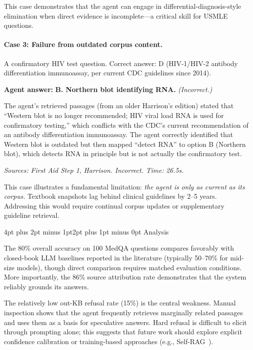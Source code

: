 \documentclass[10pt,twocolumn,letterpaper]{article}
\makeatletter
\renewcommand\subsection{\@startsection{subsection}{2}{\z@}%
  {4pt plus 2pt minus 1pt}{2pt plus 1pt minus 0pt}%
  {\normalsize\bfseries}}
\makeatother
\begin{document}
This case demonstrates that the agent can engage in differential-diagnosis-style elimination when direct evidence is incomplete---a critical skill for USMLE questions.

\paragraph{Case 3: Failure from outdated corpus content.}
A confirmatory HIV test question. Correct answer: D (HIV-1/HIV-2 antibody differentiation immunoassay, per current CDC guidelines since 2014).

\begin{casebox}
\textbf{Agent answer:} \textbf{B. Northern blot identifying RNA.} \textit{(Incorrect.)}

The agent's retrieved passages (from an older Harrison's edition) stated that ``Western blot is no longer recommended; HIV viral load RNA is used for confirmatory testing,'' which conflicts with the CDC's current recommendation of an antibody differentiation immunoassay. The agent correctly identified that Western blot is outdated but then mapped ``detect RNA'' to option B (Northern blot), which detects RNA in principle but is not actually the confirmatory test.

\textit{Sources: First Aid Step 1, Harrison. Incorrect. Time: 26.5s.}
\end{casebox}

This case illustrates a fundamental limitation: \emph{the agent is only as current as its corpus.} Textbook snapshots lag behind clinical guidelines by 2--5 years. Addressing this would require continual corpus updates or supplementary guideline retrieval.

\subsection{Analysis}

The 80\% overall accuracy on 100 MedQA questions compares favorably with closed-book LLM baselines reported in the literature (typically 50--70\% for mid-size models), though direct comparison requires matched evaluation conditions. More importantly, the 86\% source attribution rate demonstrates that the system reliably grounds its answers.

The relatively low out-KB refusal rate (15\%) is the central weakness. Manual inspection shows that the agent frequently retrieves marginally related passages and uses them as a basis for speculative answers. Hard refusal is difficult to elicit through prompting alone; this suggests that future work should explore explicit confidence calibration or training-based approaches (e.g., Self-RAG~\cite{asai2024selfrag}).
\end{document}
